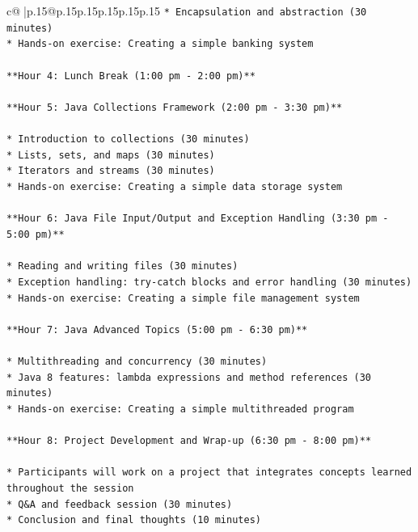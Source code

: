 \documentclass{article}
\begin{document}
{\begin{supertabular}{c@{$\;$}|p{.15\linewidth}@{}p{.15\linewidth}p{.15\linewidth}p{.15\linewidth}p{.15\linewidth}p{.15\linewidth}}
{{{\texttt{* Encapsulation and abstraction (30 minutes)} \\
\texttt{* Hands{-}on exercise: Creating a simple banking system} \\
\\ 
\texttt{**Hour 4: Lunch Break (1:00 pm {-} 2:00 pm)**} \\
\\ 
\texttt{**Hour 5: Java Collections Framework (2:00 pm {-} 3:30 pm)**} \\
\\ 
\texttt{* Introduction to collections (30 minutes)} \\
\texttt{* Lists, sets, and maps (30 minutes)} \\
\texttt{* Iterators and streams (30 minutes)} \\
\texttt{* Hands{-}on exercise: Creating a simple data storage system} \\
\\ 
\texttt{**Hour 6: Java File Input/Output and Exception Handling (3:30 pm {-} 5:00 pm)**} \\
\\ 
\texttt{* Reading and writing files (30 minutes)} \\
\texttt{* Exception handling: try{-}catch blocks and error handling (30 minutes)} \\
\texttt{* Hands{-}on exercise: Creating a simple file management system} \\
\\ 
\texttt{**Hour 7: Java Advanced Topics (5:00 pm {-} 6:30 pm)**} \\
\\ 
\texttt{* Multithreading and concurrency (30 minutes)} \\
\texttt{* Java 8 features: lambda expressions and method references (30 minutes)} \\
\texttt{* Hands{-}on exercise: Creating a simple multithreaded program} \\
\\ 
\texttt{**Hour 8: Project Development and Wrap{-}up (6:30 pm {-} 8:00 pm)**} \\
\\ 
\texttt{* Participants will work on a project that integrates concepts learned throughout the session} \\
\texttt{* Q\&A and feedback session (30 minutes)} \\
\texttt{* Conclusion and final thoughts (10 minutes)} \\
\\ 
}}}
\end{supertabular}}
\end{document}
